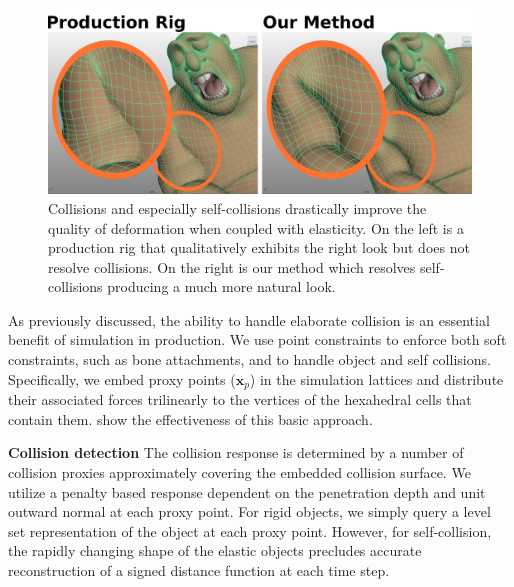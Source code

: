 

\begin{figure}
\begin{center}
\includegraphics[width=\linewidth]{elasticity/figures/collision-figure}
\end{center}
\caption{Collisions and especially self-collisions drastically improve the
  quality of deformation when coupled with elasticity. On the left is a
  production rig that qualitatively exhibits the right look but does not resolve
  collisions. On the right is our method which resolves self-collisions
  producing a much more natural look.}
\label{fig:collisions}
\vspace{-15pt}
\end{figure}

As previously discussed, the ability to handle elaborate collision is an essential benefit of simulation in production. We use point constraints to enforce both soft constraints, such as bone attachments, and to handle object and self collisions. Specifically, we embed proxy points ($\mathbf{x}_p$) in the simulation lattices and distribute their associated forces trilinearly to the vertices of the hexahedral cells that contain them. \cite{sifakis:2007:hybridsolids} show the effectiveness of this basic approach.


\textbf{Collision detection }
The collision response is determined by a number of collision proxies approximately covering the embedded collision surface. We utilize a penalty based response dependent on the penetration depth and unit outward normal at each proxy point. For rigid objects, we simply query a level set representation of the object at each proxy point. However, for self-collision, the rapidly changing shape of the elastic objects precludes accurate reconstruction of a signed distance function at each time step.

